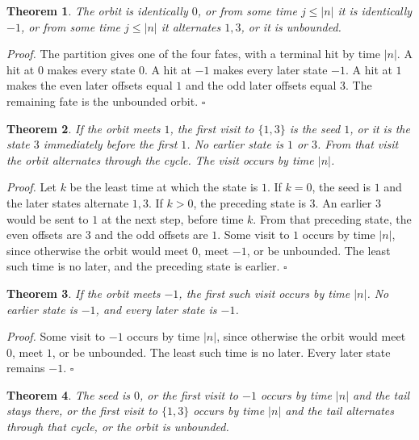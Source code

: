 \documentclass[11pt,letterpaper]{article}
\newtheorem{theorem}{Theorem}
\newenvironment{proof}{\noindent\textit{Proof.}}{\hfill\(\square\)}
\begin{document}
\begin{theorem}
\label{thm:tail}
The orbit is identically \(0\), or from some time \(j\le |n|\) it is identically \(-1\), or from some time \(j\le |n|\) it alternates \(1,3\), or it is unbounded.
\end{theorem}

\begin{proof}
The partition gives one of the four fates, with a terminal hit by time \(|n|\). A hit at \(0\) makes every state \(0\). A hit at \(-1\) makes every later state \(-1\). A hit at \(1\) makes the even later offsets equal \(1\) and the odd later offsets equal \(3\). The remaining fate is the unbounded orbit.
\end{proof}

\begin{theorem}
\label{thm:entry}
If the orbit meets \(1\), the first visit to \(\{1,3\}\) is the seed \(1\), or it is the state \(3\) immediately before the first \(1\). No earlier state is \(1\) or \(3\). From that visit the orbit alternates through the cycle. The visit occurs by time \(|n|\).
\end{theorem}

\begin{proof}
Let \(k\) be the least time at which the state is \(1\). If \(k=0\), the seed is \(1\) and the later states alternate \(1,3\). If \(k>0\), the preceding state is \(3\). An earlier \(3\) would be sent to \(1\) at the next step, before time \(k\). From that preceding state, the even offsets are \(3\) and the odd offsets are \(1\). Some visit to \(1\) occurs by time \(|n|\), since otherwise the orbit would meet \(0\), meet \(-1\), or be unbounded. The least such time is no later, and the preceding state is earlier.
\end{proof}

\begin{theorem}
\label{thm:negentry}
If the orbit meets \(-1\), the first such visit occurs by time \(|n|\). No earlier state is \(-1\), and every later state is \(-1\).
\end{theorem}

\begin{proof}
Some visit to \(-1\) occurs by time \(|n|\), since otherwise the orbit would meet \(0\), meet \(1\), or be unbounded. The least such time is no later. Every later state remains \(-1\).
\end{proof}

\begin{theorem}
\label{thm:entryclass}
The seed is \(0\), or the first visit to \(-1\) occurs by time \(|n|\) and the tail stays there, or the first visit to \(\{1,3\}\) occurs by time \(|n|\) and the tail alternates through that cycle, or the orbit is unbounded.
\end{theorem}
\end{document}
